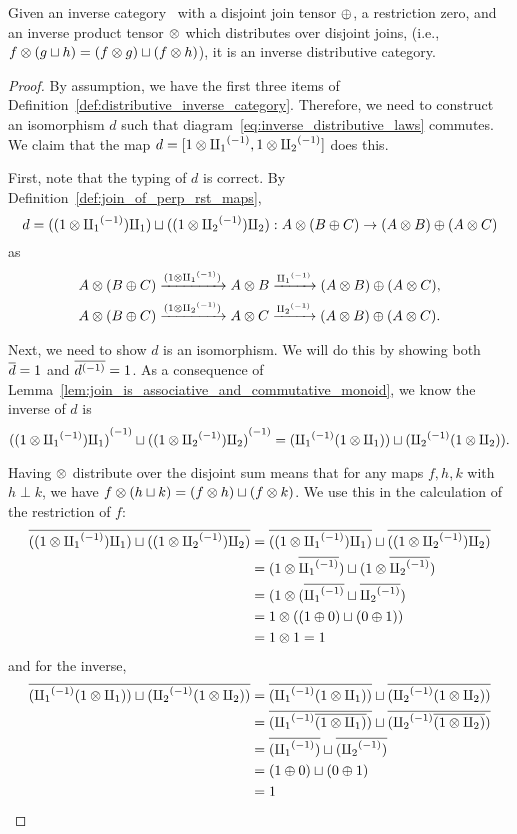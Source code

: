 \begin{lemma}
  Given an inverse category \X\ with a disjoint join tensor $\oplus$, a restriction zero, and an inverse
  product tensor $\otimes$ which distributes over disjoint joins, (i.e.,
  $f\otimes(g\sqcup h) = (f\otimes g) \sqcup (f\otimes h)$),  it is an inverse distributive  category.
\end{lemma}
\begin{proof}
  By assumption, we have the first three items of
  Definition~\ref{def:distributive_inverse_category}. Therefore, we need to construct an
  isomorphism $d$ such that diagram~\ref{eq:inverse_distributive_laws} commutes. We claim that the
  map $d = [1\otimes {\amalg_{1}}^{(-1)}, 1\otimes {\amalg_{2}}^{(-1)}]$ does this.

  First, note that the typing of $d$ is correct. By Definition~\ref{def:join_of_perp_rst_maps},
  \[
    d = ((1 \otimes {\amalg_{1}}^{(-1)}) \amalg_{1} )\sqcup ((1\otimes{\amalg_{2}}^{(-1)}) \amalg_{2}) : A \otimes (B \oplus C) \to (A\otimes B)\oplus(A\otimes C)
  \]
  as
  \begin{align*}
      A \otimes (B \oplus C) & \xrightarrow{(1\otimes{\amalg_{1}}^{(-1)})} A\otimes B \xrightarrow{{\amalg_{1}}^{(-1)}} (A\otimes B)\oplus(A\otimes C),\\
      A \otimes (B \oplus C) & \xrightarrow{(1\otimes{\amalg_{2}}^{(-1)})} A\otimes C \xrightarrow{{\amalg_{2}}^{(-1)}} (A\otimes B)\oplus(A\otimes C).
  \end{align*}

  Next, we need to show $d$ is an isomorphism. We will do this by showing both $\overline{d} = 1$ and
  $\overline{{d}^{(-1)}} = 1$.
  As a consequence of Lemma~\ref{lem:join_is_associative_and_commutative_monoid}, we know
  the inverse of $d$ is
  \[
    {((1 \otimes {\amalg_{1}}^{(-1)}) \amalg_{1} )}^{(-1)}\sqcup {((1\otimes\ensuremath{{\amalg_{2}}^{(-1)}}) \amalg_{2})}^{(-1)} =
      ( {\amalg_{1}}^{(-1)}(1 \otimes \amalg_{1}) ) \sqcup ( {\amalg_{2}}^{(-1)}(1\otimes\amalg_{2})).
  \]

  Having $\otimes$ distribute over the disjoint sum means that for any maps $f,h,k$ with $h\perp k$, we
  have $f \otimes (h\sqcup k) = (f\otimes h) \sqcup (f\otimes k)$. We use this in the calculation of the restriction
  of $f$:
  \begin{align*}
    \overline{((1 \otimes {\amalg_{1}}^{(-1)}) \amalg_{1} )\sqcup ((1\otimes{\amalg_{2}}^{(-1)}) \amalg_{2})}
      &= \overline{((1 \otimes {\amalg_{1}}^{(-1)}) \amalg_{1} )}\sqcup \overline{((1\otimes{\amalg_{2}}^{(-1)}) \amalg_{2})} \\
      &= (1\otimes \overline{{\amalg_{1}}^{(-1)}}) \sqcup (1\otimes \overline{{\amalg_{2}}^{(-1)}}) \\
      &= (1\otimes (\overline{{\amalg_{1}}^{(-1)}} \sqcup \overline{{\amalg_{2}}^{(-1)}}) \\
      &= 1\otimes ((1\oplus0) \sqcup (0\oplus1) )\\
      &=1 \otimes 1 = 1
  \end{align*}
  and for the inverse,
  \begin{align*}
    \overline{( {\amalg_{1}}^{(-1)}(1 \otimes \amalg_{1}) ) \sqcup ( {\amalg_{2}}^{(-1)}(1\otimes\amalg_{2}))}
      &= \overline{({\amalg_{1}}^{(-1)}(1 \otimes \amalg_{1}) )}\sqcup \overline{({\amalg_{2}}^{(-1)}(1\otimes\amalg_{2}))} \\
      &= \overline{({\amalg_{1}}^{(-1)}\overline{(1 \otimes \amalg_{1})} )}\sqcup \overline{({\amalg_{2}}^{(-1)}\overline{(1\otimes\amalg_{2})})} \\
      &= \overline{({\amalg_{1}}^{(-1)})}\sqcup \overline{({\amalg_{2}}^{(-1)})}\\
      &= (1\oplus0) \sqcup (0\oplus1) \\
      &= 1
  \end{align*}


\end{proof}

